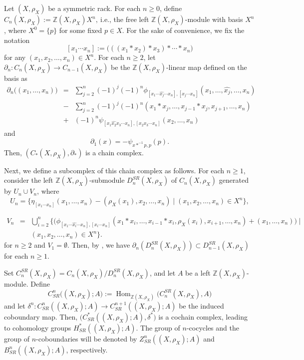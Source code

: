 \documentclass[11pt,reqno]{amsart}
\theoremstyle{definition}
\numberwithin{equation}{subsection}
\newcommand{\Hom}{\operatorname{Hom}}
\newcommand{\ie}{\mathrm{i.e.}}
\begin{document}
	
	Let $(X,\rho_X)$ be a symmetric rack. For each $n\geq0$, define $C_n(X,\rho_X):=\mathbb{Z}(X,\rho_X)X^n,~\ie$, the free left $\mathbb{Z}(X,\rho_X)$-module with basis $X^n$, where $X^0=\{p\}$ for some fixed $p \in X$. For the sake of convenience, we fix the notation 
	$$[x_1 \cdots x_n]:=\big(((x_1 \ast x_2) \ast x_3) \ast \cdots \ast x_n\big)$$ for any $(x_1, x_2, \ldots, x_n) \in X^n$. For each $n \geq 2$, let
	$\partial_n:C_{n}(X,\rho_X) \rightarrow C_{n-1}(X, \rho_X)$ be the $\mathbb{Z}(X,\rho_X)$-linear map defined on the basis as
	\begin{eqnarray*}
		\partial_n \big((x_1, \ldots, x_n) \big) &= &\sum_{j=2}^{n}(-1)^j (-1)^n \phi_{[x_1 \cdots \widehat{x_j} \cdots x_n],[x_j \cdots  x_n]}
		(x_1,\ldots, \widehat{x_j}, \ldots , x_n)\\
		& - &\sum_{j=2}^{n}(-1)^j (-1)^n (x_1 \ast x_j,\ldots,x_{j-1} \ast x_j, x_{j+1}, \ldots , x_n)\\
		& + &(-1)^n \psi_{[x_1 \widehat{x_2}x_3 \cdots x_n],[x_2 x_3 \cdots x_n]}(x_2,\ldots , x_n)
	\end{eqnarray*}
	and 
	$$\partial_1(x)=-\psi_{x \ast^{-1} p,p}(p).$$
Then, $(C_*(X,\rho_X),\partial_*)$ is a chain complex.
\par   
	
Next, we define a subcomplex of this chain complex as follows. For each $n \ge 1$, consider the left $\mathbb{Z}(X,\rho_X)$-submodule $D_n^{SR}(X,\rho_X)$ of $C_n(X,\rho_X)$ generated by $U_n \cup V_n$, where
	$$U_n= \big\{ \eta_{[x_1 \cdots x_n]}(x_1, \ldots, x_n)- (\rho_X(x_1),x_2, \ldots ,x_n ) \mid (x_1, x_2, \ldots, x_n) \in X^n \big\},$$

	\begin{eqnarray*}
		V_n &=& \bigcup_{i=2}^n \Big\{\big(\phi_{[x_1 \cdots \widehat{x_i} \cdots x_n],[x_i \cdots x_n]} (x_1 \ast x_i, \ldots , x_{i-1} \ast x_i, \rho_X(x_i),x_{i+1}, \ldots, x_n)+(x_1, \ldots, x_n) \big) \mid\\
		&&  (x_1, x_2, \ldots, x_n) \in X^n \Big\}.
	\end{eqnarray*}
for $n \ge 2$ and $V_1=\emptyset$. Then, by  \cite[Proposition 6.6]{KSS2024}, we have $\partial_n(D_{n}^{SR}(X,\rho_X)) \subset D_{n-1}^{SR}(X,\rho_X)$ for each $n \ge 1$.
\par

Set $C_n^{SR}(X,\rho_X)= C_n(X,\rho_X)/ D_n^{SR}(X,\rho_X)$, and let $A$ be a left $\mathbb{Z}(X,\rho_X)$-module. Define $$C^n_{SR} \big((X,\rho_X);A \big):=\Hom_{\mathbb{Z}(X,\rho_X)} \big(C_n^{SR}(X,\rho_X),A\big)$$ and let $\delta^n: C^n_{SR}((X,\rho_X);A) \to C^{n+1}_{SR}((X,\rho_X);A)$ be the induced coboundary map. Then, $\big(C^*_{SR}((X,\rho_X);A),\delta^*\big)$ is a cochain complex, leading to cohomology groups $H^*_{SR}((X,\rho_X);A)$. The group of $n$-cocycles and the group of $n$-coboundaries will be denoted by $Z_{SR}^{n}((X, \rho_{X});A)$ and $B_{SR}^{n}((X, \rho_{X});A)$, respectively.
\par
\end{document}
